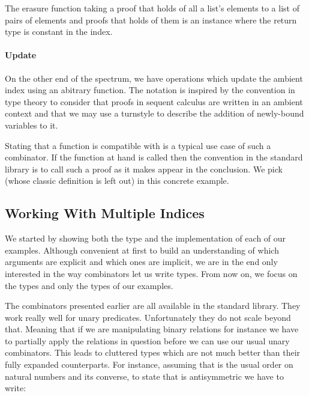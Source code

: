 
The erasure function taking a proof that  holds of all a list's
elements to a list of pairs of elements and proofs that  holds
of them is an instance where the return type is constant in the index.


\paragraph{Update} On the other end of the spectrum, we have operations
which update the ambient index using an abitrary function. The notation
 is inspired by the convention in type theory to consider that
proofs in sequent calculus are written in an ambient context and that we
may use a turnstyle to describe the addition of newly-bound variables to
it.


Stating that a function is compatible with  is a typical use case
of such a combinator. If the function at hand is called  then the
convention in the standard library is to call such a proof  as it
makes  appear in the conclusion. We pick  (whose classic
definition is left out) in this concrete example.


\subsection{Working With Multiple Indices}

We started by showing both the type and the implementation of each of our
examples. Although convenient at first to build an understanding of which
arguments are explicit and which ones are implicit, we are in the end only
interested in the way combinators let us write types. From now on, we
focus on the types and only the types of our examples.

The combinators presented earlier are all available in the standard library.
They work really well for unary predicates. Unfortunately they do not scale
beyond that. Meaning that if we are manipulating binary relations for
instance we have to partially apply the relations in question before we can
use our usual unary combinators. This leads to cluttered types which are not
much better than their fully expanded counterparts. For instance, assuming
that  is the usual order on natural numbers and  its
converse, to state that  is antisymmetric we have to write:

